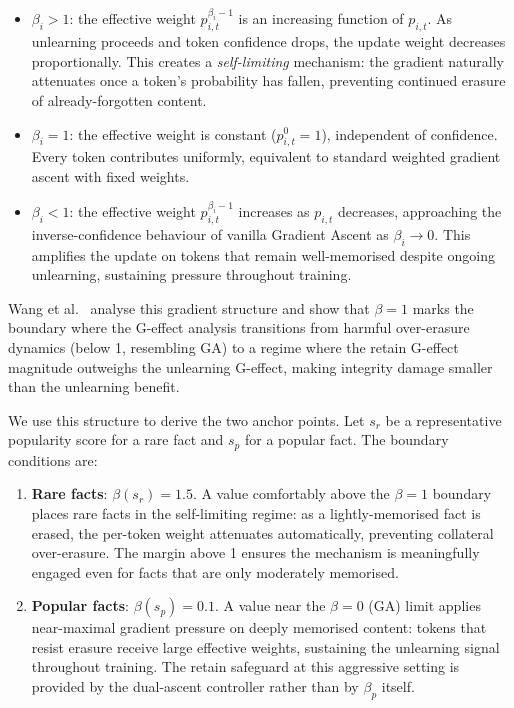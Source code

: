 \begin{itemize}
    \item $\beta_i > 1$: the effective weight $p_{i,t}^{\beta_i - 1}$ is an increasing function of $p_{i,t}$. As unlearning proceeds and token confidence drops, the update weight decreases proportionally. This creates a \emph{self-limiting} mechanism: the gradient naturally attenuates once a token's probability has fallen, preventing continued erasure of already-forgotten content.
    \item $\beta_i = 1$: the effective weight is constant ($p_{i,t}^0 = 1$), independent of confidence. Every token contributes uniformly, equivalent to standard weighted gradient ascent with fixed weights.
    \item $\beta_i < 1$: the effective weight $p_{i,t}^{\beta_i - 1}$ increases as $p_{i,t}$ decreases, approaching the inverse-confidence behaviour of vanilla Gradient Ascent as $\beta_i \to 0$. This amplifies the update on tokens that remain well-memorised despite ongoing unlearning, sustaining pressure throughout training.
\end{itemize}

Wang et al.~\cite{wang2025rethinking} analyse this gradient structure and show that $\beta = 1$ marks the boundary where the G-effect analysis transitions from harmful over-erasure dynamics (below 1, resembling GA) to a regime where the retain G-effect magnitude outweighs the unlearning G-effect, making integrity damage smaller than the unlearning benefit.

We use this structure to derive the two anchor points. Let $s_r$ be a representative popularity score for a rare fact and $s_p$ for a popular fact. The boundary conditions are:
\begin{enumerate}
    \item \textbf{Rare facts}: $\beta(s_r) = 1.5$. A value comfortably above the $\beta = 1$ boundary places rare facts in the self-limiting regime: as a lightly-memorised fact is erased, the per-token weight attenuates automatically, preventing collateral over-erasure. The margin above 1 ensures the mechanism is meaningfully engaged even for facts that are only moderately memorised.
    \item \textbf{Popular facts}: $\beta(s_p) = 0.1$. A value near the $\beta = 0$ (GA) limit applies near-maximal gradient pressure on deeply memorised content: tokens that resist erasure receive large effective weights, sustaining the unlearning signal throughout training. The retain safeguard at this aggressive setting is provided by the dual-ascent controller rather than by $\beta_p$ itself.
\end{enumerate}

